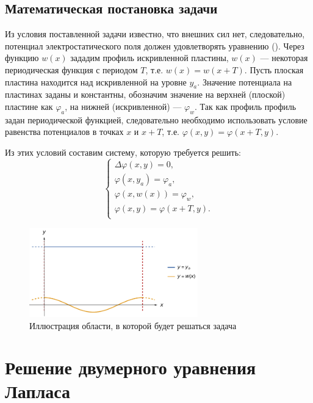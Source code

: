 \documentclass[12pt, a4paper]{article}
\renewcommand{\phi}{\varphi}
\begin{document}
		\subsection{Математическая постановка задачи}
			
			Из условия поставленной задачи известно, что внешних сил нет, следовательно, потенциал электростатического поля должен удовлетворять уравнению (). Через функцию $w(x)$ зададим профиль искривленной пластины, $w(x)$  --- некоторая периодическая функция с периодом $T$, т.е. $w(x) = w(x + T)$. Пусть плоская пластина находится над искривленной на уровне $y_a$. Значение потенциала на пластинах заданы и константны, обозначим значение на верхней (плоской) пластине как $\phi_a$, на нижней (искривленной) --- $\phi_w$. Так как профиль профиль задан периодической функцией, следовательно необходимо использовать условие равенства потенциалов в точках $x$ и $x + T$, т.е. $\phi (x, y) = \phi (x + T, y)$.
			
			Из этих условий составим систему, которую требуется решить: 		
			\begin{equation}
				\begin{cases}
					\Delta \phi (x, y)  = 0, \\
					\phi (x, y_a) = \phi_a, \\
					\phi (x, w(x)) = \phi_w, \\
					\phi (x, y) = \phi (x + T, y).\\
					
				\end{cases}
			\end{equation}
			\begin{figure}[!h]
				\centering
				\includegraphics[width=0.65\textwidth]{illustr.pdf}
				\caption{Иллюстрация области, в которой будет решаться задача}
				\label{fig:illustr_1}
			\end{figure}
	
	
	\section{Решение двумерного уравнения Лапласа}
		
\end{document}

